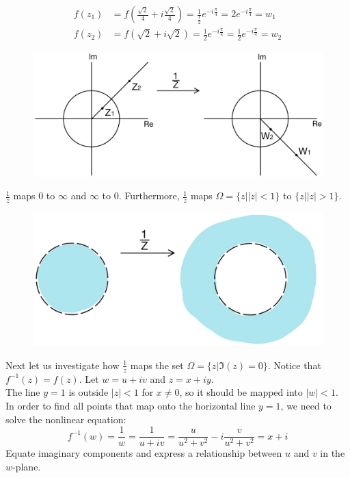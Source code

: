 \documentclass[11pt]{article}
\begin{document}
\begin{align*}
f(z_1) &= f\left(\frac{\sqrt{2}}{4} + i\frac{\sqrt{2}}{4}\right) = \frac{1}{\frac{1}{2}}e^{-i\frac{\pi}{4}} = 2e^{-i\frac{\pi}{4}} = w_1\\
f(z_2) &= f\left(\sqrt{2} + i\sqrt{2}\right) = \frac{1}{2}e^{-i\frac{\pi}{4}} = \frac{1}{2}e^{-i\frac{\pi}{4}} = w_2
\end{align*}
\begin{figure}[H]
\includegraphics[scale = 0.2]{9_7}
\centering
\end{figure}
$\frac{1}{z}$ maps 0 to $\infty$ and $\infty$ to 0. Furthermore, $\frac{1}{z}$ maps $\Omega = \{z||z| < 1\}$ to $\{z||z| > 1\}$. 
\begin{figure}[H]
\includegraphics[scale = 0.2]{9_8}
\centering
\end{figure}
Next let us investigate how $\frac{1}{z}$ maps the set $\Omega= \{z|\Im(z) = 0\}$. Notice that $f^{-1}(z) = f(z)$. Let $w = u + iv$ and $z = x + iy$. \\
The line $y = 1$ is outside $|z| < 1$ for $x \neq 0$, so it should be mapped into $|w| < 1$. In order to find all points that map onto the horizontal line $y = 1$, we need to solve the nonlinear equation: 
$$f^{-1}(w) = \frac{1}{w} = \frac{1}{u + iv} = \frac{u}{u^2 + v^2} - i\frac{v}{u^2 + v^2} = x + i$$
Equate imaginary components and express a relationship between $u$ and $v$ in the $w$-plane. 
\end{document}
